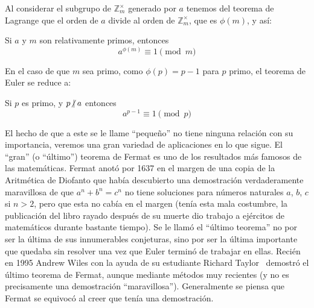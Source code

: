   Al considerar el subgrupo de \(\mathbb{Z}^\times_m\) generado por \(a\)
  tenemos del teorema de Lagrange%
  que el orden de \(a\) divide al orden de \(\mathbb{Z}^\times_m\),
  que es \(\phi(m)\),
  y así:
  \begin{theorem}[Euler]
    \label{theo:Euler}
    Si \(a\) y \(m\) son relativamente primos,
    entonces
    \begin{equation*}
      a^{\phi(m)}
	\equiv 1 \pmod{m}
    \end{equation*}
  \end{theorem}
  En el caso de que \(m\) sea primo,
  como \(\phi(p) = p - 1\) para \(p\) primo,
  el teorema de Euler se reduce a:
  \begin{theorem}
    \label{theo:Fermat}
    Si	\(p\) es primo,
    y \(p \centernot\mid a\)
    entonces
    \begin{equation*}
      a^{p - 1}
	\equiv 1 \pmod{p}
    \end{equation*}
  \end{theorem}
  El hecho de que a este se le llame ``pequeño''
  no tiene ninguna relación con su importancia,
  veremos una gran variedad de aplicaciones en lo que sigue.
  El ``gran'' (o ``último'') teorema de Fermat%
  es uno de los resultados más famosos de las matemáticas.
  Fermat anotó por 1637%
  en el margen de una copia de la Aritmética de Diofanto%
  que había descubierto una demostración verdaderamente maravillosa
  de que \(a^n + b^n = c^n\)
  no tiene soluciones
  para números naturales \(a\), \(b\), \(c\) si \(n > 2\),
  pero que esta no cabía en el margen
  (tenía esta mala costumbre,
   la publicación del libro rayado después de su muerte
   dio trabajo a ejércitos de matemáticos durante bastante tiempo).
  Se le llamó el ``último teorema''
  no por ser la última de sus innumerables conjeturas,
  sino por ser la última importante que quedaba sin resolver
  una vez que Euler terminó de trabajar en ellas.
  Recién en 1995 Andrew Wiles con la ayuda de su estudiante Richard Taylor~%
    \cite{taylor95:_ring_theor_proper_hecke_alg,
	  wiles95:_modul_ellip_curves_Fermat}
  demostró el último teorema de Fermat,
  aunque mediante métodos muy recientes
  (y no es precisamente una demostración ``maravillosa'').
  Generalmente se piensa que Fermat se equivocó
  al creer que tenía una demostración.


